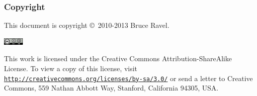 
\begin{frame}
  \frametitle{Copyright}
  \tiny

  This document is copyright \copyright\ 2010-2013 Bruce Ravel.

  \begin{center}
    \includegraphics[width=1.0cm]{cc-by-sa.png}
  \end{center}

  This work is licensed under the Creative Commons
  Attribution-ShareAlike License.  To view a copy of this license,
  visit \href{http://creativecommons.org/licenses/by-sa/3.0/}
  {\color{Purple4}\texttt{http://creativecommons.org/licenses/by-sa/3.0/}}
  or send a letter to Creative Commons, 559 Nathan Abbott Way,
  Stanford, California 94305, USA.


\end{frame}
